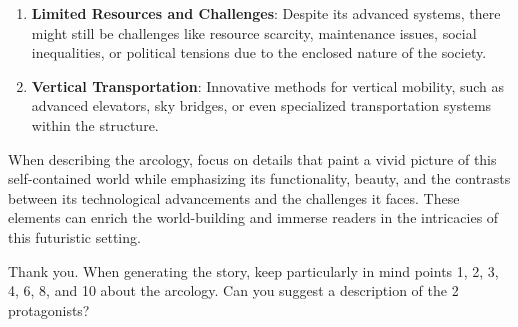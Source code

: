 \begin{aquote}
\begin{enumerate}
        \item \textbf{Limited Resources and Challenges}: Despite its advanced systems, there might still be challenges like resource scarcity, maintenance issues, social inequalities, or political tensions due to the enclosed nature of the society.
        \item \textbf{Vertical Transportation}: Innovative methods for vertical mobility, such as advanced elevators, sky bridges, or even specialized transportation systems within the structure.
    \end{enumerate}
When describing the arcology, focus on details that paint a vivid picture of this self-contained world while emphasizing its functionality, beauty, and the contrasts between its technological advancements and the challenges it faces. These elements can enrich the world-building and immerse readers in the intricacies of this futuristic setting.
\end{aquote}

\begin{qquote}
    Thank you. When generating the story, keep particularly in mind points 1, 2, 3, 4, 6, 8, and 10 about the arcology. Can you suggest a description of the 2 protagonists?
\end{qquote}

